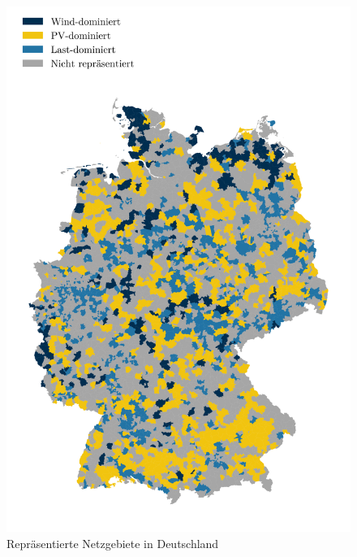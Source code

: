 \begin{figure}[H]
    \centering
    \includegraphics[width=\textwidth]{Bilder/clusters_representatives}
    \caption{Repräsentierte Netzgebiete in Deutschland}\label{fig:map_representatives}
\end{figure}